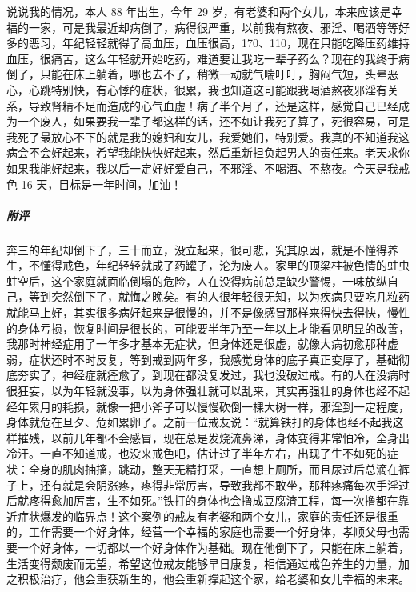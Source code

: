 \begin{case}
    说说我的情况，本人 88 年出生，今年 29 岁，有老婆和两个女儿，本来应该是幸福的一家，可是我最近却病倒了，病得很严重，以前我有熬夜、邪淫、喝酒等等好多的恶习，年纪轻轻就得了高血压，血压很高，170、110，现在只能吃降压药维持血压，很痛苦，这么年轻就开始吃药，难道要让我吃一辈子药么？现在的我终于病倒了，只能在床上躺着，哪也去不了，稍微一动就气喘吁吁，胸闷气短，头晕恶心，心跳特别快，有心悸的症状，很累，我也知道这可能跟我喝酒熬夜邪淫有关系，导致肾精不足而造成的心气血虚！病了半个月了，还是这样，感觉自己已经成为一个废人，如果要我一辈子都这样的话，还不如让我死了算了，死很容易，可是我死了最放心不下的就是我的媳妇和女儿，我爱她们，特别爱。我真的不知道我这病会不会好起来，希望我能快快好起来，然后重新担负起男人的责任来。老天求你如果我能好起来，我以后一定好好爱自己，不邪淫、不喝酒、不熬夜。今天是我戒色 16 天，目标是一年时间，加油！
    \subparagraph{附评} 奔三的年纪却倒下了，三十而立，没立起来，很可悲，究其原因，就是不懂得养生，不懂得戒色，年纪轻轻就成了药罐子，沦为废人。家里的顶梁柱被色情的蛀虫蛀空后，这个家庭就面临倒塌的危险，人在没得病前总是缺少警惕，一味放纵自己，等到突然倒下了，就悔之晚矣。有的人很年轻很无知，以为疾病只要吃几粒药就能马上好，其实很多病好起来是很慢的，并不是像感冒那样来得快去得快，慢性的身体亏损，恢复时间是很长的，可能要半年乃至一年以上才能看见明显的改善，我那时神经症用了一年多才基本无症状，但身体还是很虚，就像大病初愈那种虚弱，症状还时不时反复，等到戒到两年多，我感觉身体的底子真正变厚了，基础彻底夯实了，神经症就痊愈了，到现在都没复发过，我也没破过戒。有的人在没病时很狂妄，以为年轻就没事，以为身体强壮就可以乱来，其实再强壮的身体也经不起经年累月的耗损，就像一把小斧子可以慢慢砍倒一棵大树一样，邪淫到一定程度，身体就危在旦夕、危如累卵了。之前一位戒友说：“就算铁打的身体也经不起我这样摧残，以前几年都不会感冒，现在总是发烧流鼻涕，身体变得非常怕冷，全身出冷汗。一直不知道戒，也没来戒色吧，估计过了半年左右，出现了生不如死的症状：全身的肌肉抽搐，跳动，整天无精打采，一直想上厕所，而且尿过后总滴在裤子上，还有就是会阴涨疼，疼得非常厉害，导致我都不敢坐，那种疼痛每次手淫过后就疼得愈加厉害，生不如死。”铁打的身体也会撸成豆腐渣工程，每一次撸都在靠近症状爆发的临界点！这个案例的戒友有老婆和两个女儿，家庭的责任还是很重的，工作需要一个好身体，经营一个幸福的家庭也需要一个好身体，孝顺父母也需要一个好身体，一切都以一个好身体作为基础。现在他倒下了，只能在床上躺着，生活变得颓废而无望，希望这位戒友能够早日康复，相信通过戒色养生的力量，加之积极治疗，他会重获新生的，他会重新撑起这个家，给老婆和女儿幸福的未来。
\end{case}

